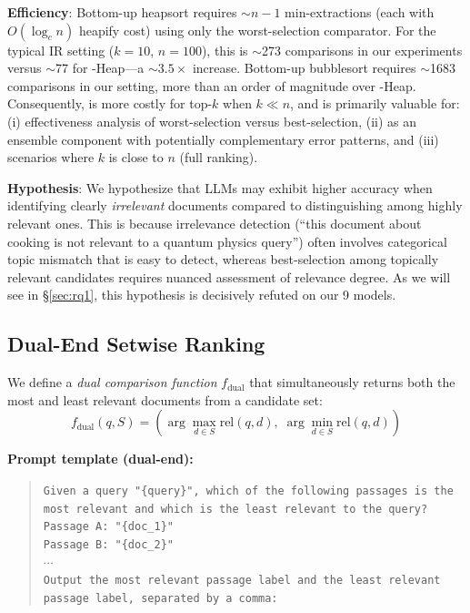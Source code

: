 \textbf{Efficiency}: Bottom-up heapsort requires $\sim$$n-1$ min-extractions (each with $O(\log_c n)$ heapify cost) using only the worst-selection comparator. For the typical IR setting ($k=10$, $n=100$), this is $\sim$273 comparisons in our experiments versus $\sim$77 for \topdown{}-Heap---a $\sim$$3.5\times$ increase. Bottom-up bubblesort requires $\sim$1683 comparisons in our setting, more than an order of magnitude over \topdown{}-Heap. Consequently, \bottomup{} is more costly for top-$k$ when $k \ll n$, and is primarily valuable for: (i) effectiveness analysis of worst-selection versus best-selection, (ii) as an ensemble component with potentially complementary error patterns, and (iii) scenarios where $k$ is close to $n$ (full ranking).

\textbf{Hypothesis}: We hypothesize that LLMs may exhibit higher accuracy when identifying clearly \emph{irrelevant} documents compared to distinguishing among highly relevant ones. This is because irrelevance detection (``this document about cooking is not relevant to a quantum physics query'') often involves categorical topic mismatch that is easy to detect, whereas best-selection among topically relevant candidates requires nuanced assessment of relevance degree. As we will see in \S\ref{sec:rq1}, this hypothesis is decisively refuted on our 9 models.


\subsection{Dual-End Setwise Ranking}
\label{sec:dualend}

We define a \emph{dual comparison function} $f_{\text{dual}}$ that simultaneously returns both the most and least relevant documents from a candidate set:
\begin{equation}
f_{\text{dual}}(q, S) = \left(\arg\max_{d \in S} \text{rel}(q,d),\; \arg\min_{d \in S} \text{rel}(q,d)\right)
\label{eq:fdual}
\end{equation}

\textbf{Prompt template (dual-end):}
\begin{quote}
\small\texttt{Given a query "\{query\}", which of the following passages is the most relevant and which is the least relevant to the query?}\\
\texttt{Passage A: "\{doc\_1\}"}\\
\texttt{Passage B: "\{doc\_2\}"}\\
$\cdots$\\
\texttt{Output the most relevant passage label and the least relevant passage label, separated by a comma:}
\end{quote}

